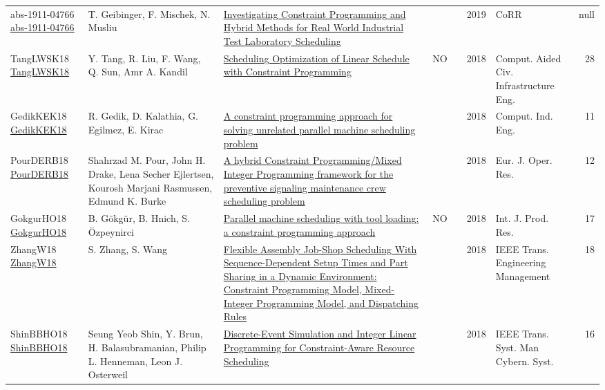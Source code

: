 {\begin{longtable}{p{3cm}p{6cm}p{7cm}rrrp{3cm}r}
abs-1911-04766 \href{http://arxiv.org/abs/1911.04766}{abs-1911-04766} & T. Geibinger, F. Mischek, N. Musliu & \href{articles/abs-1911-04766.pdf}{Investigating Constraint Programming and Hybrid Methods for Real World Industrial Test Laboratory Scheduling} &  & \cite{abs-1911-04766} & 2019 & CoRR & null\\
TangLWSK18 \href{https://doi.org/10.1111/mice.12277}{TangLWSK18} & Y. Tang, R. Liu, F. Wang, Q. Sun, Amr A. Kandil & \href{articles/TangLWSK18.pdf}{Scheduling Optimization of Linear Schedule with Constraint Programming} & NO & \cite{TangLWSK18} & 2018 & Comput. Aided Civ. Infrastructure Eng. & 28\\
GedikKEK18 \href{https://doi.org/10.1016/j.cie.2018.05.014}{GedikKEK18} & R. Gedik, D. Kalathia, G. Egilmez, E. Kirac & \href{articles/GedikKEK18.pdf}{A constraint programming approach for solving unrelated parallel machine scheduling problem} &  & \cite{GedikKEK18} & 2018 & Comput. Ind. Eng. & 11\\
PourDERB18 \href{https://doi.org/10.1016/j.ejor.2017.08.033}{PourDERB18} & Shahrzad M. Pour, John H. Drake, Lena Secher Ejlertsen, Kourosh Marjani Rasmussen, Edmund K. Burke & \href{articles/PourDERB18.pdf}{A hybrid Constraint Programming/Mixed Integer Programming framework for the preventive signaling maintenance crew scheduling problem} &  & \cite{PourDERB18} & 2018 & Eur. J. Oper. Res. & 12\\
GokgurHO18 \href{https://doi.org/10.1080/00207543.2017.1421781}{GokgurHO18} & B. G{\"{o}}kg{\"{u}}r, B. Hnich, S. {\"{O}}zpeynirci & \href{articles/GokgurHO18.pdf}{Parallel machine scheduling with tool loading: a constraint programming approach} & NO & \cite{GokgurHO18} & 2018 & Int. J. Prod. Res. & 17\\
ZhangW18 \href{https://doi.org/10.1109/TEM.2017.2785774}{ZhangW18} & S. Zhang, S. Wang & \href{articles/ZhangW18.pdf}{Flexible Assembly Job-Shop Scheduling With Sequence-Dependent Setup Times and Part Sharing in a Dynamic Environment: Constraint Programming Model, Mixed-Integer Programming Model, and Dispatching Rules} &  & \cite{ZhangW18} & 2018 & {IEEE} Trans. Engineering Management & 18\\
ShinBBHO18 \href{https://doi.org/10.1109/TSMC.2017.2681623}{ShinBBHO18} & Seung Yeob Shin, Y. Brun, H. Balasubramanian, Philip L. Henneman, Leon J. Osterweil & \href{articles/ShinBBHO18.pdf}{Discrete-Event Simulation and Integer Linear Programming for Constraint-Aware Resource Scheduling} &  & \cite{ShinBBHO18} & 2018 & {IEEE} Trans. Syst. Man Cybern. Syst. & 16\\

\end{longtable}}
